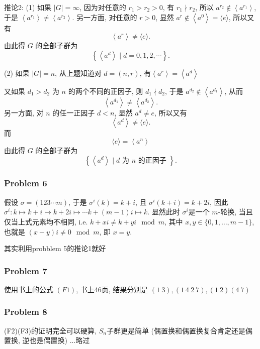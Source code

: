 \documentclass[a4paper,12pt]{ctexart}
\begin{document}
    推论2: (1)  如果 $|G|=\infty$, 因为对任意的 $r_{1}>r_{2}>0$, 有 $r_{1} \nmid r_{2}$, 所以 $a^{r_{2}} \notin\left\langle a^{r_{1}}\right\rangle$, 于是 $\left\langle a^{r_{1}}\right\rangle \neq\left\langle a^{r_{2}}\right\rangle .$
    另一方面, 对任意的 $r>0$, 显然 $a^{r} \notin\left\langle a^{0}\right\rangle=\langle e\rangle$, 所以又有
    \[\left\langle a^{r}\right\rangle \neq\langle e\rangle .\]
    由此得 $G$ 的全部子群为
    \[\left\{\left\langle a^{d}\right\rangle \mid d=0,1,2, \cdots\right\} .\]

    (2) 如果 $ |G|=n $, 从上题知道对 $ d=(n,r) $, 有$ \left\langle a^{r}\right\rangle=\left\langle a^{d}\right\rangle $
    
    又如果 $d_{1}>d_{2}$ 为 $n$ 的两个不同的正因子, 则 $d_{1} \nmid d_{2}$, 于是 $a^{d_{2}} \notin\left\langle a^{d_{1}}\right\rangle$, 从而
    $$
    \left\langle a^{d_{1}}\right\rangle \neq\left\langle a^{d_{2}}\right\rangle .
    $$
    另一方面, 对 $n$ 的任一正因子 $d<n$, 显然 $a^{d} \neq e$, 所以又有
    $$
    \left\langle a^{d}\right\rangle \neq\langle e\rangle .
    $$
    而
    $$
    \langle e\rangle=\left\langle a^{n}\right\rangle
    $$
    由此得 $G$ 的全部子群为
    $$
    \left\{\left\langle a^{d}\right\rangle \mid d \text { 为 } n \text { 的正因子 }\right\} .
    $$
\subsubsection*{Problem 6}
    假设 $ \sigma=(1 2 3\cdots m) $, 于是 $ \sigma^i(k)=k+i $, 且 $ \sigma^i(k+i)=k+2i $, 因此 $ \sigma^i:k\mapsto k+i\mapsto k+2i\mapsto\cdots k+(m-1)i\mapsto k $.
    显然此时 $ \sigma^i $是一个 $ m $-轮换, 当且仅当上式元素均不相同, i.e. $ k+xi\neq k+yi\mod{m} $, 其中 $ x,y\in\{0,1,\dots,m-1\} $, 也就是 $ (x-y)i\neq 0\mod{m} $, 即 $ x=y $. 

    其实利用probblem 5的推论1就好
\subsubsection*{Problem 7}
    使用书上的公式 $ (F1) $, 书上46页, 
    结果分别是 $ (1 ~3),(1~4~2~7),(1~2)(4~7) $
\subsubsection*{Problem 8}
    (F2)(F3)的证明完全可以硬算, $ S_n $子群更是简单 (偶置换和偶置换复合肯定还是偶置换, 逆也是偶置换) ...略过
    
\end{document}
